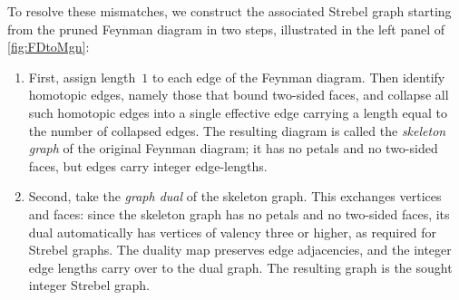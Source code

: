 \documentclass[a4paper,11pt,english]{article}
\theoremstyle{plain}
\theoremstyle{definition}
\theoremstyle{plain}
\begin{document}
To resolve these mismatches, we construct the associated Strebel graph starting from the pruned Feynman diagram in two steps, illustrated in the left panel of \cref{fig:FDtoMgn}:
\begin{enumerate}[label=\roman*)]
    \item First, assign length~$1$ to each edge of the Feynman diagram. Then identify homotopic edges, namely those that bound two-sided faces, and collapse all such homotopic edges into a single effective edge carrying a length equal to the number of collapsed edges. The resulting diagram is called the \emph{skeleton graph} of the original Feynman diagram; it has no petals and no two-sided faces, but edges carry integer edge-lengths.
    
    \item Second, take the \emph{graph dual} of the skeleton graph. This exchanges vertices and faces: since the skeleton graph has no petals and no two-sided faces, its dual automatically has vertices of valency three or higher, as required for Strebel graphs. The duality map preserves edge adjacencies, and the integer edge lengths carry over to the dual graph. The resulting graph is the sought integer Strebel graph.
\end{enumerate}
\end{document}
